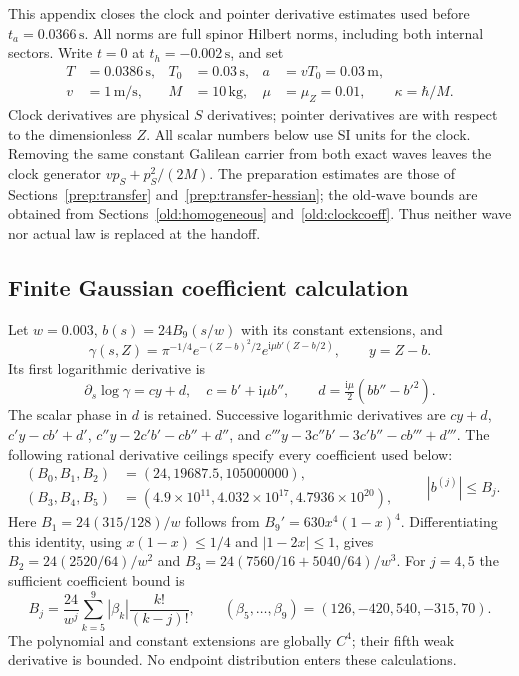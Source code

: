 \documentclass[11pt]{article}
\theoremstyle{definition}\newtheorem{definition}[theorem]{Definition}
\theoremstyle{remark}\newtheorem{remark}[theorem]{Remark}
\begin{document}
This appendix closes the clock and pointer derivative estimates used before
$t_a=0.0366\,\mathrm s$.  All norms are full spinor Hilbert norms, including
both internal sectors.  Write $t=0$ at $t_h=-0.002\,\mathrm s$, and set
\[
 \begin{aligned}
 T&=0.0386\,\mathrm s,&T_0&=0.03\,\mathrm s,&
 a&=vT_0=0.03\,\mathrm m,\\
 v&=1\,\mathrm{m/s},&M&=10\,\mathrm{kg},&
 \mu&=\mu_Z=0.01,\qquad\kappa=\hbar/M.
 \end{aligned}
\]
Clock derivatives are physical $S$ derivatives; pointer derivatives are
with respect to the dimensionless $Z$.  All scalar numbers below use SI
units for the clock.  Removing the same constant Galilean carrier from
both exact waves leaves the clock generator $vp_S+p_S^2/(2M)$.
The preparation estimates are those of
Sections~\ref{prep:transfer} and~\ref{prep:transfer-hessian}; the old-wave
bounds are obtained from Sections~\ref{old:homogeneous}
and~\ref{old:clockcoeff}.  Thus neither wave nor actual law is replaced
at the handoff.

\subsection{Finite Gaussian coefficient calculation}
\label{prefix:gaussian}
Let $w=0.003$, $b(s)=24B_9(s/w)$ with its constant extensions, and
\[
 \gamma(s,Z)=\pi^{-1/4}e^{-(Z-b)^2/2}
                   e^{\mathrm i\mu b'(Z-b/2)},\qquad y=Z-b.
\]
Its first logarithmic derivative is
\[
 \partial_s\log\gamma=c y+d,
 \quad c=b'+\mathrm i\mu b'',\qquad
 d=\tfrac{\mathrm i\mu}{2}(bb''-b'^2).
\]
The scalar phase in $d$ is retained.  Successive logarithmic derivatives
are $cy+d$, $c'y-cb'+d'$, $c''y-2c'b'-cb''+d''$, and
$c'''y-3c''b'-3c'b''-cb'''+d'''$.
The following rational derivative ceilings specify every coefficient
used below:
\[
 \begin{aligned}
 (B_0,B_1,B_2)&=(24,19687.5,105000000),\\
 (B_3,B_4,B_5)&=(4.9\times10^{11},4.032\times10^{17},
                                      4.7936\times10^{20}),
 \end{aligned}
 \qquad |b^{(j)}|\le B_j.
\]
Here $B_1=24(315/128)/w$ follows from
$B_9'=630x^4(1-x)^4$.  Differentiating this identity, using
$x(1-x)\le1/4$ and $|1-2x|\le1$, gives
$B_2=24(2520/64)/w^2$ and
$B_3=24(7560/16+5040/64)/w^3$.
For $j=4,5$ the sufficient coefficient bound is
\[
 B_j=\frac{24}{w^j}
       \sum_{k=5}^9 |\beta_k|\frac{k!}{(k-j)!},
 \qquad (\beta_5,\ldots,\beta_9)=(126,-420,540,-315,70).
\]
The polynomial and constant extensions are globally $C^4$; their fifth
weak derivative is bounded.  No endpoint distribution enters these
calculations.
\end{document}
